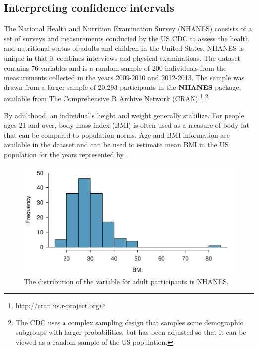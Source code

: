 \begin{spacing}{1.5}

\subsection{Interpreting confidence intervals}
\label{interpretingCIs}


The National Health and Nutrition Examination Survey (NHANES) consists of a set of surveys and measurements conducted by the US CDC to assess the health and nutritional status of adults and children in the United States. NHANES is unique in that it combines interviews and physical examinations.  The dataset  contains 76 variables and is a random sample of 200 individuals from the measurements collected in the years 2009-2010 and 2012-2013. The sample was drawn from a larger sample of 20,293 participants in the \textbf{NHANES} package, available from The Comprehensive R Archive Network (CRAN).\footnote{\url{http://cran.us.r-project.org}} \footnote{The CDC uses a complex sampling design that samples some demographic subgroups with larger probabilities, but  has been adjusted so that it can be viewed as a random sample of the US population.}  

By adulthood, an individual's height and weight generally stabilize. For people ages 21 and over, body mass index (BMI) is often used as a measure of body fat that can be compared to population norms. Age and BMI information are available in the dataset and can be used to estimate mean BMI in the US population for the years represented by .

\begin{figure}[h]
	\centering
	\includegraphics[width=\textwidth]
	{ch_inference_foundations_oi_biostat/figures/nhanesAdultBmiHist/nhanesAdultBmiHist}
	\caption{The distribution of the variable  for adult participants in NHANES.}
	\label{nhanesAdultBmiHist}
\end{figure}


\end{spacing}
